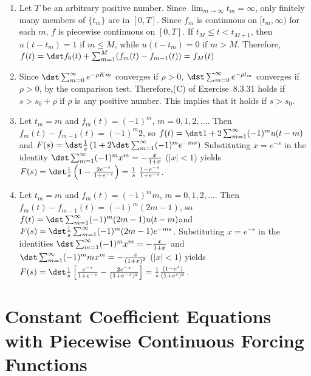 \documentclass[openany]{book}
\newenvironment{sectionSolutions}{
 \begin{enumerate}[item-label={\thesection.\arabic{enumi}.}]
}{
 \end{enumerate}
}
\begin{document}
\begin{sectionSolutions}
\item
Let $T$ be an arbitrary positive number.
Since $\lim_{m\to\infty}t_m=\infty$, only finitely many
members of  $\{t_m\}$ are in $[0,T]$.
Since $f_m$ is continuous on $[t_m,\infty)$ for each $m$,
$f$ is piecewise continuous on $[0,T]$.
If $t_M\le t<t_{M+1}$, then   $u(t-t_m)=1$ if $m\le M$, while
$u(t-t_m)=0$ if $m>M$. Therefore,
$f(t)=\dst f_0(t)+\sum_{m=1}^M(f_m(t)-f_{m-1}(t))=f_M(t)$


\item Since $\dst\sum_{m=0}^\infty e^{-\rho Km}$
converges if $\rho>0$, $\dst\sum_{m=0}^\infty e^{-\rho t_m}$ converges
if $\rho>0$, by the comparison test. Therefore,(C) of
Exercise~8.3.31 holds if $s>s_0+\rho$ if $\rho$ is any positive
number. This implies that it holds if $s>s_0$.


\item
Let $t_m=m$ and $f_m(t)=(-1)^m$, $m=0,1,2,\dots$.
Then $f_m(t)-f_{m-1}(t)=(-1)^m2$, so
$f(t)=\dst1+2\sum_{m=1}^\infty (-1)^mu(t-m)$ and
$F(s)=\dst\frac{1}{ s}\left(1+2\dst\sum_{m=1}^\infty(-1)^me^{-ms}
\right)$
Substituting $x=e^{-s}$ in the identity $\dst\sum_{m=1}^\infty
(-1)^mx^m=-\frac{x}{1+x}$ ($|x|<1$) yields
$F(s)=\dst\frac{1}{ s}\left(1-\frac{2e^{-s}}{1+e^{-s}}\right)=
\frac{1}{ s}\ \frac{1-e^{-s}}{ 1+e^{-s}}$.



\item
Let $t_m=m$ and $f_m(t)=(-1)^mm$, $m=0,1,2,\dots$.
Then $f_m(t)-f_{m-1}(t)=(-1)^m(2m-1)$, so
$f(t)=\dst\sum_{m=1}^\infty(-1)^m(2m-1)u(t-m)$and
$F(s)=\dst\frac{1}{ s}\sum_{m=1}^\infty(-1)^m(2m-1)e^{-ms}$.
Substituting $x=e^{-s}$ in the identities $\dst\sum_{m=1}^\infty
(-1)^mx^m=-\frac{x}{1+x}$ and $\dst\sum_{m=1}^\infty
(-1)^mmx^m=-\frac{x}{(1+x)^2}$
($|x|<1$) yields
$F(s)=\dst\frac{1}{
s}\left[\frac{e^{-s}}{1+e^{-s}}-\frac{2e^{-s}}{(1+e^{-s})^2}\right]=
\frac{1}{ s}\frac{(1-e^s)}{(1+e^s)^2}$.
\end{sectionSolutions}

\section[running={Piecewise Continuous Forcing Functions}]
{Constant Coefficient Equations with Piecewise Continuous Forcing Functions}
\end{document}
